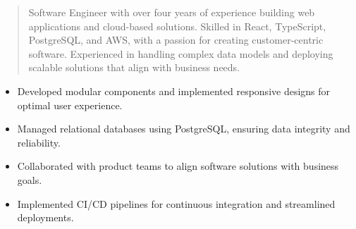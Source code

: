 



\makecvheader

\begin{quote}
  \noindent
  Software Engineer with over four years of experience building web applications and cloud-based solutions. Skilled in React, TypeScript, PostgreSQL, and AWS, with a passion for creating customer-centric software. Experienced in handling complex data models and deploying scalable solutions that align with business needs.
\end{quote}


\par\smallskip
\noindent
\begin{minipage}{20cm}
  \begin{minipage}{9.75cm}
    \begin{itemize}
      \item Developed modular components and implemented responsive designs for optimal user experience.
      \item Managed relational databases using PostgreSQL, ensuring data integrity and reliability.
    \end{itemize}
  \end{minipage}
  \hfill
  \begin{minipage}{9.75cm}
    \begin{itemize}
      \item Collaborated with product teams to align software solutions with business goals.
      \item Implemented CI/CD pipelines for continuous integration and streamlined deployments.
    \end{itemize}
  \end{minipage}
\end{minipage}
\par\smallskip
\divider

